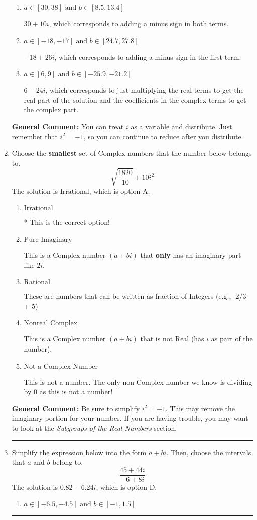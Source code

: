 \documentclass{extbook}[14pt]
\newcommand{\litem}[1]{\item #1

\rule{\textwidth}{0.4pt}}
\begin{document}
\begin{enumerate}
{\begin{enumerate}[label=\Alph*.]
* $30 - 10 i$, which is the correct option.
\item \( a \in [30, 38] \text{ and } b \in [8.5, 13.4] \)

 $30 + 10 i$, which corresponds to adding a minus sign in both terms.
\item \( a \in [-18, -17] \text{ and } b \in [24.7, 27.8] \)

 $-18 + 26 i$, which corresponds to adding a minus sign in the first term.
\item \( a \in [6, 9] \text{ and } b \in [-25.9, -21.2] \)

 $6 - 24 i$, which corresponds to just multiplying the real terms to get the real part of the solution and the coefficients in the complex terms to get the complex part.
\end{enumerate}

\textbf{General Comment:} You can treat $i$ as a variable and distribute. Just remember that $i^2=-1$, so you can continue to reduce after you distribute.
}
\litem{
Choose the \textbf{smallest} set of Complex numbers that the number below belongs to.
\[ \sqrt{\frac{1820}{10}}+10i^2 \]The solution is \( \text{Irrational} \), which is option A.\begin{enumerate}[label=\Alph*.]
\item \( \text{Irrational} \)

* This is the correct option!
\item \( \text{Pure Imaginary} \)

This is a Complex number $(a+bi)$ that \textbf{only} has an imaginary part like $2i$.
\item \( \text{Rational} \)

These are numbers that can be written as fraction of Integers (e.g., -2/3 + 5)
\item \( \text{Nonreal Complex} \)

This is a Complex number $(a+bi)$ that is not Real (has $i$ as part of the number).
\item \( \text{Not a Complex Number} \)

This is not a number. The only non-Complex number we know is dividing by 0 as this is not a number!
\end{enumerate}

\textbf{General Comment:} Be sure to simplify $i^2 = -1$. This may remove the imaginary portion for your number. If you are having trouble, you may want to look at the \textit{Subgroups of the Real Numbers} section.
}
\litem{
Simplify the expression below into the form $a+bi$. Then, choose the intervals that $a$ and $b$ belong to.
\[ \frac{45 + 44 i}{-6 + 8 i} \]The solution is \( 0.82  - 6.24 i \), which is option D.\begin{enumerate}[label=\Alph*.]
\item \( a \in [-6.5, -4.5] \text{ and } b \in [-1, 1.5] \)


\end{enumerate}}
\end{enumerate}
\end{document}
